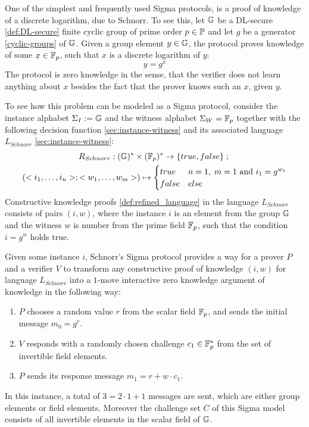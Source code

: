 \begin{example}
\label{ex:interactive-Schnorr}
One of the simplest and frequently used Sigma protocols, is a proof of knowledge of a discrete logarithm,  due to Schnorr. To see this, let $\mathbb{G}$ be a DL-secure \ref{def:DL-secure} finite cyclic group of prime order $p\in\mathbb{P}$ and let $g$ be a generator \ref{cyclic-groups} of $\mathbb{G}$. Given a group element $y\in \mathbb{G}$, the protocol proves knowledge of some $x \in \mathbb{F}_p$, such that $x$ is a discrete logarithm of $y$:
$$
y = g^x
$$
The protocol is zero knowledge in the sense, that the verifier does not learn anything about $x$ besides the fact that the prover knows such an $x$, given $y$.

To see how this problem can be modeled as a Sigma protocol, consider the instance alphabet $\Sigma_I:=\mathbb{G}$ and the witness alphabet $\Sigma_W= \mathbb{F}_p$ together with the following decision function \ref{sec:instance-witness} and its associated language $L_{Schnorr}$ \ref{sec:instance-witness}:
\begin{multline*}
R_{Schnorr} : (\mathbb{G})^* \times (\mathbb{F}_p)^* \to \{true, false\}\;;\;\\
(<i_1,\ldots,i_n>;<w_1,\ldots, w_m>) \mapsto
\begin{cases}
true & n=1,\; m=1 \text{ and } i_1 = g^{w_1}\\
false & else
\end{cases}
\end{multline*}
Constructive knowledge proofs \ref{def:refined_language} in the language $L_{Schnorr}$ consists of pairs $(i,w)$, where the instance $i$ is an element from the group $\mathbb{G}$ and the witness $w$ is number from the prime field $\mathbb{F}_p$, such that the condition $i=g^w$ holds true.

Given some instance $i$, Schnorr's Sigma protocol provides a way for a prover $P$ and a verifier $V$ to transform any constructive proof of knowledge $(i,w)$ for language $L_{Schnorr}$ into a $1$-move interactive zero knowledge argument of knowledge in the following way:
\begin{enumerate}
\item $P$ chooses a random value $r$ from the scalar field $\mathbb{F}_p$, and sends the initial message $m_0=g^r$. 
\item $V$ responds with a randomly chosen challenge $c_1\in \mathbb{F}^*_p$ from the set of invertible field elements.
\item $P$ sends its response message $m_1=r+w\cdot c_1$.
\end{enumerate}
In this instance, a total of $3=2\cdot 1 + 1$ messages are sent, which are either group elements or field elements. Moreover the challenge set $C$ of this Sigma model consists of all invertible elements in the scalar field of $\mathbb{G}$.


\end{example}
